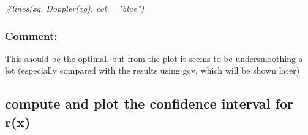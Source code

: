 \documentclass[]{article}
\newenvironment{Shaded}{\begin{snugshade}}{\end{snugshade}}
\newcommand{\CommentTok}[1]{\textcolor[rgb]{0.56,0.35,0.01}{\textit{#1}}}
\begin{document}
\begin{Shaded}
\begin{Highlighting}[]
\CommentTok{#lines(xg, Doppler(xg), col = "blue")}
\end{Highlighting}
\end{Shaded}

\subsubsection{Comment:}\label{comment-1}

This should be the optimal, but from the plot it seems to be
undersmoothing a lot (especially compared with the results using gcv,
which will be shown later)

\subsection{compute and plot the confidence interval for
r(x)}\label{compute-and-plot-the-confidence-interval-for-rx}
\end{document}
